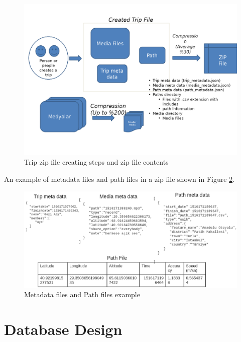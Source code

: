 \begin{figure}[!htbp]
\centering
\includegraphics[width=\textwidth]{projectChapters/images/creatingZipFile.png}
\caption{Trip zip file creating steps and zip file contents}
\label{fig:creatingZipFile}
\end{figure}

An example of metadata files and path files in a zip file shown in Figure \ref{fig:metadata}.

\begin{figure}[!htbp]
\centering
\includegraphics[width=\textwidth]{projectChapters/images/metadata.png}
\caption{Metadata files and Path files example}
\label{fig:metadata}
\end{figure}

\newpage

\section{Database Design}

